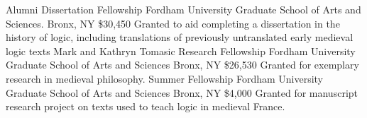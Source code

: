 {Alumni Dissertation Fellowship}
{Fordham University Graduate School of Arts and Sciences.}
{Bronx, NY}
{\$30,450}
{Granted to aid completing a dissertation in the history of logic, 
	including translations of previously untranslated early medieval logic texts}
{Mark and Kathryn Tomasic Research Fellowship}
{Fordham University Graduate School of Arts and Sciences}
{Bronx, NY}
{\$26,530}
{Granted for exemplary research in medieval philosophy.}
{Summer Fellowship}
{Fordham University Graduate School of Arts and Sciences}
{Bronx, NY}
{\$4,000}
{Granted for manuscript research project on texts used to teach logic in medieval France.}
